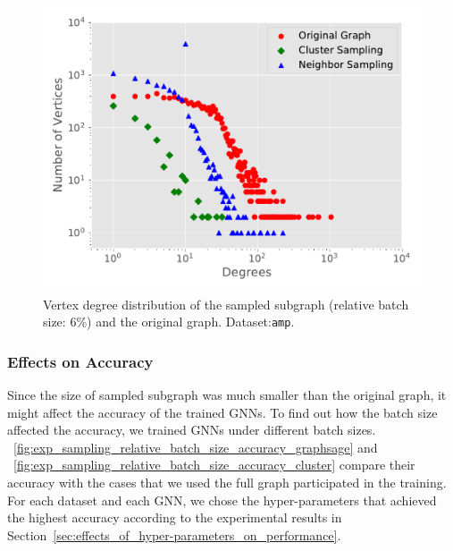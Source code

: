 \begin{figure}[H]
    \centering
    \includegraphics[width=0.4\columnwidth]{figs/experiments/exp_sampling_minibatch_degrees_distribution_amazon-photo.pdf}
    \caption{Vertex degree distribution of the sampled subgraph (relative batch size: 6\%) and the original graph. Dataset:\texttt{amp}.}
    \label{fig:exp_sampling_minibatch_degrees_distribution}
\end{figure}

\subsubsection{Effects on Accuracy}

Since the size of sampled subgraph was much smaller than the original graph, it might affect the accuracy of the trained GNNs.
%
To find out how the batch size affected the accuracy, we trained GNNs under different batch sizes.
%
\figurename~\ref{fig:exp_sampling_relative_batch_size_accuracy_graphsage} and \figurename~\ref{fig:exp_sampling_relative_batch_size_accuracy_cluster} compare their accuracy with the cases that we used the full graph participated in the training.
%
For each dataset and each GNN, we chose the hyper-parameters that achieved the highest accuracy according to the experimental results in Section~\ref{sec:effects_of_hyper-parameters_on_performance}.

